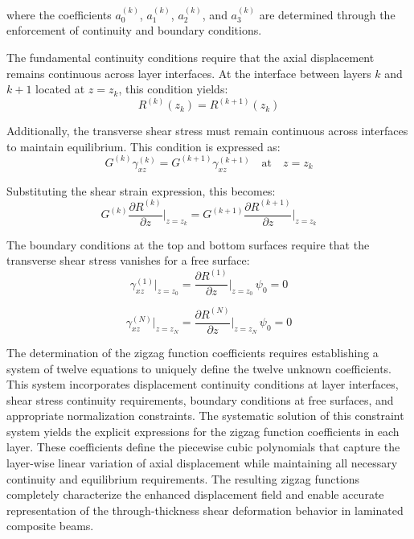 \documentclass[12pt,a4paper]{report}
\begin{document}
where the coefficients $a_0^{(k)}$, $a_1^{(k)}$, $a_2^{(k)}$, and $a_3^{(k)}$ are determined through the enforcement of continuity and boundary conditions.

The fundamental continuity conditions require that the axial displacement remains continuous across layer interfaces. At the interface between layers $k$ and $k+1$ located at $z = z_k$, this condition yields:
\begin{equation}
R^{(k)}(z_k) = R^{(k+1)}(z_k)
\end{equation}

Additionally, the transverse shear stress must remain continuous across interfaces to maintain equilibrium. This condition is expressed as:
\begin{equation}
G^{(k)} \gamma_{xz}^{(k)} = G^{(k+1)} \gamma_{xz}^{(k+1)} \quad \text{at} \quad z = z_k
\end{equation}

Substituting the shear strain expression, this becomes:
\begin{equation}
G^{(k)} \frac{\partial R^{(k)}}{\partial z}\bigg|_{z=z_k} = 
G^{(k+1)} \frac{\partial R^{(k+1)}}{\partial z}\bigg|_{z=z_k}
\end{equation}

The boundary conditions at the top and bottom surfaces require that the transverse shear stress vanishes for a free surface:
\begin{equation}
\gamma_{xz}^{(1)}\bigg|_{z=z_0} = \frac{\partial R^{(1)}}{\partial z}\bigg|_{z=z_0} \, \psi_0 = 0
\end{equation}

\begin{equation}
\gamma_{xz}^{(N)}\bigg|_{z=z_N} = \frac{\partial R^{(N)}}{\partial z}\bigg|_{z=z_N} \, \psi_0 = 0
\end{equation}

The determination of the zigzag function coefficients requires establishing a system of twelve equations to uniquely define the twelve unknown coefficients. This system incorporates displacement continuity conditions at layer interfaces, shear stress continuity requirements, boundary conditions at free surfaces, and appropriate normalization constraints.
The systematic solution of this constraint system yields the explicit expressions for the zigzag function coefficients in each layer. These coefficients define the piecewise cubic polynomials that capture the layer-wise linear variation of axial displacement while maintaining all necessary continuity and equilibrium requirements. The resulting zigzag functions completely characterize the enhanced displacement field and enable accurate representation of the through-thickness shear deformation behavior in laminated composite beams.
\end{document}
